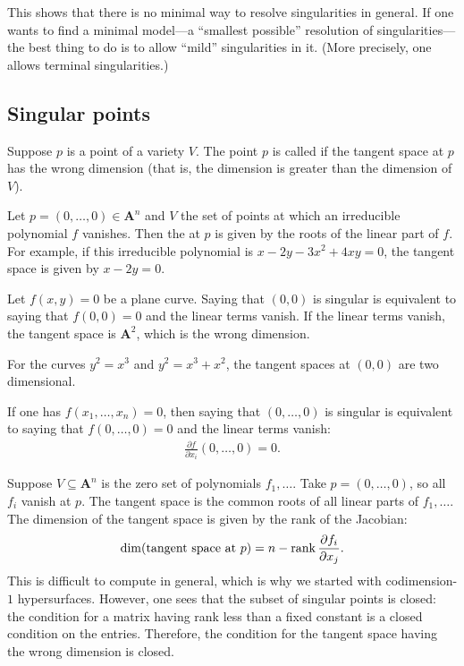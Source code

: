 \documentclass[11pt, oneside,margin=1in]{article}
\begin{document}
	This shows that there is no minimal way to resolve singularities in general. If one wants to find a minimal model---a ``smallest possible'' resolution of singularities---the best thing to do is to allow ``mild'' singularities in it. (More precisely, one allows terminal singularities.)
\subsection{Singular points}
Suppose $p$ is a point of a variety $V$. The point $p$ is called  if the tangent space at $p$ has the wrong dimension (that is, the dimension is greater than the dimension of $V$).

Let $p=(0,\hdots, 0)\in  \mathbf{A}^n$ and $V$ the set of points at which an irreducible polynomial $f$ vanishes. Then the  at $p$ is given by the roots of the linear part of $f$. For example, if this irreducible polynomial is $x-2y-3x^2+4xy =0$, the tangent space is given by $x-2y=0$.

Let $f(x,y)=0$ be a plane curve. Saying that $(0,0)$ is singular is equivalent to saying that $f(0,0)=0$ and the linear terms vanish. If the linear terms vanish, the tangent space is $\mathbf{A}^2$, which is the wrong dimension.

\begin{example}[ ]\label{}\text{}
For the curves $y^2 = x^3$ and $y^2 = x^3+x^2$, the tangent spaces at $(0,0)$ are two dimensional.
\end{example}

If one has $f(x_1,\hdots, x_n) =0$, then saying that $(0,\hdots, 0)$ is singular is equivalent to saying that $f(0,\hdots,0)=0$ and the linear terms vanish: 
\begin{align*}
	\frac{\partial f}{\partial x_i}(0,\hdots, 0) =0.
\end{align*}

Suppose $V\subseteq \mathbf{A}^n$ is the zero set of polynomials $f_1,\hdots$. Take $p=(0,\hdots, 0)$, so all $f_i$ vanish at $p$. The tangent space is the common roots of all linear parts of $f_1,\hdots$. The dimension of the tangent space is given by the rank of the Jacobian:
\begin{align*}
	\dim(\textrm{tangent space at $p$}) = n-\operatorname{rank} \frac{\partial f_i}{\partial x_j}.
\end{align*}
This is difficult to compute in general, which is why we started with codimension-$1$ hypersurfaces. However, one sees that the subset of singular points is closed: the condition for a matrix having rank less than a fixed constant is a closed condition on the entries. Therefore, the condition for the tangent space having the wrong dimension is closed.
\end{document}
